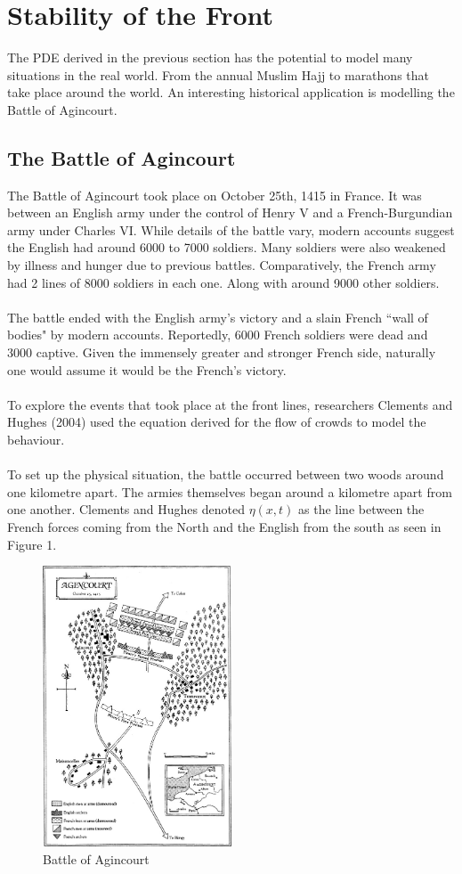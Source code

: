 \documentclass{article}
\begin{document}
\section{Stability of the Front}
The PDE derived in the previous section has the potential to model many situations in the real world. From the annual Muslim Hajj to marathons that take place around the world. An interesting historical application is modelling the Battle of Agincourt.

\subsection{The Battle of Agincourt}
The Battle of Agincourt took place on October 25th, 1415 in France. It was between an English army under the control of Henry V and a French-Burgundian army under Charles VI. While details of the battle vary, modern accounts suggest the English had around 6000 to 7000 soldiers. Many soldiers were also weakened by illness and hunger due to previous battles. Comparatively, the French army had 2 lines of 8000 soldiers in each one. Along with around 9000 other soldiers. \\
\\
The battle ended with the English army's victory and a slain French ``wall of bodies" by modern accounts. Reportedly, 6000 French soldiers were dead and 3000 captive. Given the immensely greater and stronger French side, naturally one would assume it would be the French's victory.\\
\\
To explore the events that took place at the front lines, researchers Clements and Hughes (2004) used the equation derived for the flow of crowds to model the behaviour.\\
\\
To set up the physical situation, the battle occurred between two woods around one kilometre apart. The armies themselves began around a kilometre apart from one another. Clements and Hughes denoted $\eta(x,t)$ as the line between the French forces coming from the North and the English from the south as seen in Figure 1. \\
\begin{figure}[h]
\caption{Battle of Agincourt}
\centering
\includegraphics[width=0.5\textwidth]{battlefield.jpg}
\end{figure}
\end{document}
